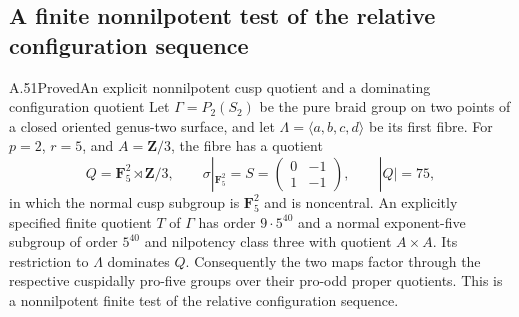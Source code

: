 \subsection{A finite nonnilpotent test of the relative configuration sequence}

\begin{claim}{A.51}{Proved}{An explicit nonnilpotent cusp quotient and a dominating configuration quotient}
Let $\Gamma=P_2(S_2)$ be the pure braid group on two points of a
closed oriented genus-two surface, and let
$\Lambda=\langle a,b,c,d\rangle$ be its first fibre. For $p=2$,
$r=5$, and $A=\mathbf Z/3$, the fibre has a quotient
\[
 Q=\mathbf F _5^2\rtimes\mathbf Z/3,
 \qquad \sigma|_{\mathbf F _5^2}=
 S=\begin{pmatrix}0&-1\\1&-1\end{pmatrix},
 \qquad |Q|=75,
\]
in which the normal cusp subgroup is $\mathbf F _5^2$ and is
noncentral. An explicitly specified finite quotient $T$ of $\Gamma$
has order $9\cdot5^{40}$ and a normal exponent-five subgroup of
order $5^{40}$ and nilpotency class three with quotient $A\times A$. Its
restriction to $\Lambda$ dominates $Q$. Consequently the two maps
factor through the respective cuspidally pro-five groups over their
pro-odd proper quotients. This is a nonnilpotent finite test of the
relative configuration sequence.
\end{claim}

